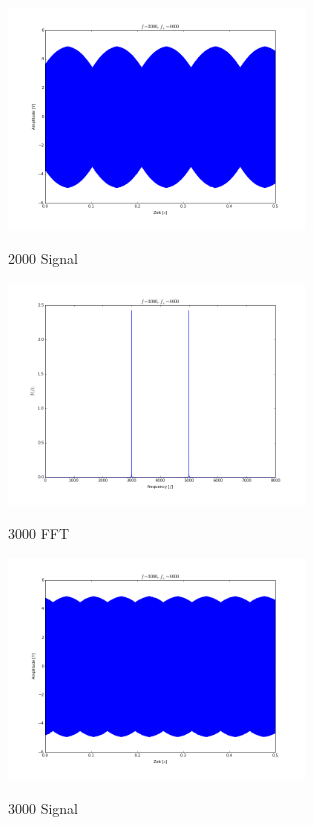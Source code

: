 \documentclass[TGAI_Laborbericht.tex]{subfiles}
\begin{document}
\begin{figure}[H]
	\includegraphics[width=0.7\textwidth]{media/2000-signal.png}
	\label{2000 Signal}
	\caption{2000 Signal}
\end{figure}

\begin{figure}[H]
	\includegraphics[width=0.7\textwidth]{media/3000-fft.png}
	\label{3000 FFT}
	\caption{3000 FFT}
\end{figure}

\begin{figure}[H]
	\includegraphics[width=0.7\textwidth]{media/3000-signal.png}
	\label{3000 Signal}
	\caption{3000 Signal}
\end{figure}
\end{document}
